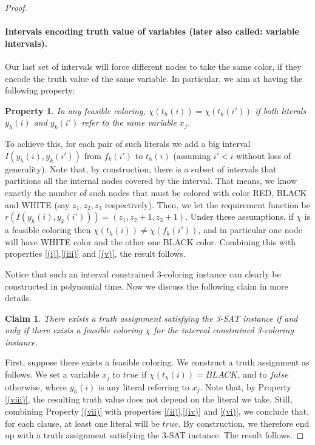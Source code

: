 \documentclass[a4paper,11pt]{article}
\theoremstyle{theorem}
\newtheorem{claim}[theorem]{Claim}
\newtheorem{property}[theorem]{Property}
\begin{document}
\begin{proof}
\paragraph{Intervals encoding truth value of variables (later also called: variable intervals).} Our last set of intervals will force different nodes to take the same color, if they encode the truth value of the same variable. In particular, we aim at having the following property:

\begin{property}\label{(viii)}
In any feasible coloring, $\chi(t_h(i) ) = \chi(t_k(i'))$ if both literals $y_h(i)$ and $y_k(i')$ refer to the same variable $x_j$.
\end{property}

\noindent To achieve this, for each pair of such literals we add a big interval $I(y_h(i), y_k(i'))$ from $f_k(i')$ to $t_h(i)$ (assuming $i' < i$ without loss of generality). Note that, by construction, there is a subset of intervals that partitions all the internal nodes covered by the interval. That means, we know exactly the number of such nodes that must be colored with color RED, BLACK and WHITE (say $z_1,z_2,z_3$ respectively). Then, we let the requirement function be $r(I(y_h(i), y_k(i'))) = (z_1, z_2+1, z_3+1)$. Under these assumptions, if $\chi$ is a feasible coloring then  $\chi(t_h(i)) \neq \chi(f_k(i'))$, and in particular one node will have WHITE color and the other one BLACK color. Combining this with properties \eqref{(i)},\eqref{(iii)} and \eqref{(v)}, the result follows.


\medskip
Notice that such an interval constrained 3-coloring instance can clearly be constructed in polynomial time. Now we discuss the following claim in more details.

\begin{claim}
There exists a truth assignment satisfying the 3-SAT instance if and only if there exists a feasible coloring $\chi$ for the interval constrained 3-coloring instance.
\end{claim}

First, suppose there exists a feasible coloring. We construct a truth assignment as follows. We set a variable $x_j$ to $true$ if $\chi(t_h(i))=BLACK$, and to $false$ otherwise, where $y_h(i)$ is any literal referring to $x_j$. 
Note that, by Property  \eqref{(viii)}, the resulting truth value does not depend on the literal we take. 
Still, combining Property \eqref{(vii)} with properties \eqref{(ii)},\eqref{(iv)} and \eqref{(vi)}, we conclude that, for each clause, at least one literal will be $true$. By construction, we therefore end up with a truth assignment satisfying the 3-SAT instance. The result follows.


\end{proof}
\end{document}
